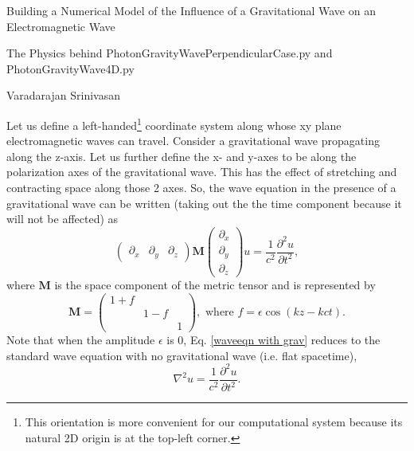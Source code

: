 \documentclass{article}
\begin{document}
\begin{flushleft}
{\large Building a Numerical Model of the Influence of a Gravitational Wave on an Electromagnetic Wave}

The Physics behind PhotonGravityWavePerpendicularCase.py and PhotonGravityWave4D.py

\smallskip
Varadarajan Srinivasan
\smallskip
\end{flushleft}

Let us define a left-handed\footnote{This orientation is more convenient for our computational system because its natural 2D origin is at the top-left corner.} coordinate system along whose xy plane electromagnetic waves can travel. Consider a gravitational wave propagating along the z-axis. Let us further define the x- and y-axes to be along the polarization axes of the gravitational wave. This has the effect of stretching and contracting space along those 2 axes. So, the wave equation in the presence of a gravitational wave can be written (taking out the the time component because it will not be affected) as
\begin{equation} \label{waveeqn with grav}
\begin{pmatrix}\partial_x & \partial_y & \partial_z\end{pmatrix} 
\textbf{M}
\begin{pmatrix} \partial_x \\ \partial_y \\ \partial_z \end{pmatrix}
u
=\frac{1}{c^2}\frac{\partial^2 u}{\partial t^2},
\end{equation}
where $\textbf{M}$ is the space component of the metric tensor and is represented by
\begin{equation} \label{M}
\textbf{M}=\begin{pmatrix}
1+f \\
 & 1-f \\
 & & 1
\end{pmatrix},
\text{ \ \ \ where } f=\epsilon \cos(kz-kct).
\end{equation}
Note that when the amplitude $\epsilon$ is 0, Eq. \ref{waveeqn with grav} reduces to the standard wave equation with no gravitational wave (i.e. flat spacetime),
\begin{equation} \label{waveeqn flat}
\nabla^2u=\frac{1}{c^2}\frac{\partial^2u}{\partial t^2}.
\end{equation}
\end{document}
